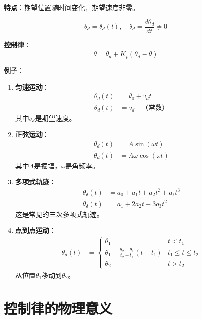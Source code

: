 \documentclass[12pt,a4paper]{article}
\begin{document}
\textbf{特点}：期望位置随时间变化，期望速度非零。

\begin{equation}
\theta_d = \theta_d(t), \quad \dot{\theta}_d = \frac{d\theta_d}{dt} \neq 0
\end{equation}

\textbf{控制律}：
\begin{equation}
\dot{\theta} = \dot{\theta}_d + K_p(\theta_d - \theta)
\end{equation}

\textbf{例子}：

\begin{enumerate}
\item \textbf{匀速运动}：
\begin{align}
\theta_d(t) &= \theta_0 + v_d t \\
\dot{\theta}_d(t) &= v_d \quad \text{（常数）}
\end{align}
其中$v_d$是期望速度。

\item \textbf{正弦运动}：
\begin{align}
\theta_d(t) &= A \sin(\omega t) \\
\dot{\theta}_d(t) &= A\omega \cos(\omega t)
\end{align}
其中$A$是振幅，$\omega$是角频率。

\item \textbf{多项式轨迹}：
\begin{align}
\theta_d(t) &= a_0 + a_1 t + a_2 t^2 + a_3 t^3 \\
\dot{\theta}_d(t) &= a_1 + 2a_2 t + 3a_3 t^2
\end{align}
这是常见的三次多项式轨迹。

\item \textbf{点到点运动}：
\begin{align}
\theta_d(t) &= \begin{cases}
\theta_1 & t < t_1 \\
\theta_1 + \frac{\theta_2 - \theta_1}{t_2 - t_1}(t - t_1) & t_1 \leq t \leq t_2 \\
\theta_2 & t > t_2
\end{cases}
\end{align}
从位置$\theta_1$移动到$\theta_2$。
\end{enumerate}

\section{控制律的物理意义}
\end{document}
